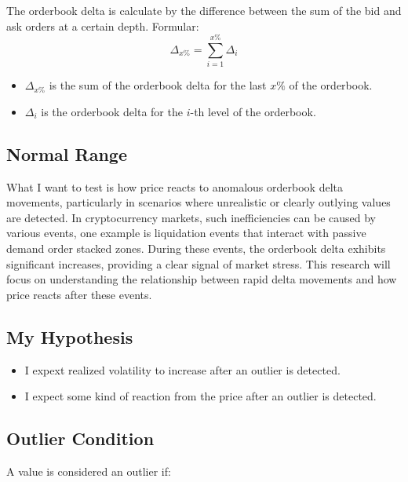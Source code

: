 \documentclass[12pt]{article}
\begin{document}
The orderbook delta is calculate by the difference between the sum of the bid and ask orders at a certain depth.
Formular:
\begin{equation*}
  \Delta_{x\%} = \sum_{i=1}^{x\%} \Delta_{i}
\end{equation*}

\begin{itemize}
  \item $\Delta_{x\%}$ is the sum of the orderbook delta for the last $x\%$ of the orderbook.
  \item $\Delta_{i}$ is the orderbook delta for the $i$-th level of the orderbook.
\end{itemize}



\subsection{Normal Range}

What I want to test is how price reacts to anomalous orderbook delta movements, particularly in scenarios where unrealistic or clearly outlying values are detected. In cryptocurrency markets, such inefficiencies can be caused by various events, one example is liquidation
 events that interact with passive demand order stacked zones. During these events, the orderbook delta exhibits significant increases, providing a clear signal of market stress. This research will focus on understanding the relationship between rapid delta movements and how price reacts after these events.

\subsection{My Hypothesis}

\begin{itemize}
  \item I expext realized volatility to increase after an outlier is detected. 
  \item I expect some kind of reaction from the price after an outlier is detected.
\end{itemize}



\subsection{Outlier Condition}

A value is considered an outlier if:
\end{document}
